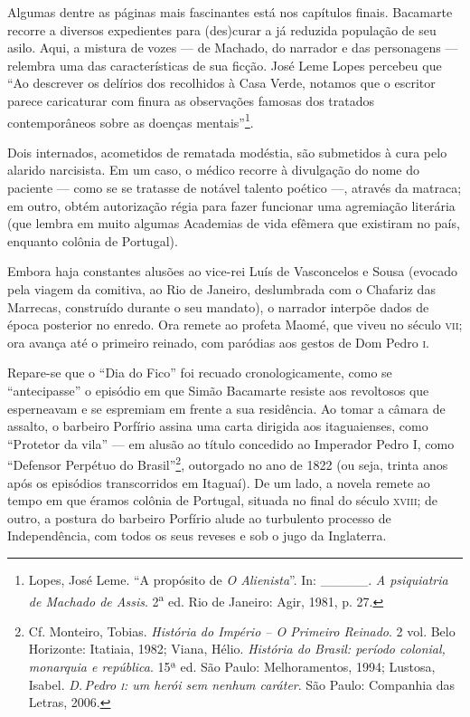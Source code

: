 Algumas dentre as páginas mais fascinantes está nos capítulos finais.
Bacamarte recorre a diversos expedientes para (des)curar a já reduzida
população de seu asilo. Aqui, a mistura de vozes --- de Machado, do
narrador e das personagens --- relembra uma das características de sua
ficção. José Leme Lopes percebeu que ``Ao descrever os delírios dos
recolhidos à Casa Verde, notamos que o escritor parece caricaturar com
finura as observações famosas dos tratados contemporâneos sobre as
doenças mentais''\footnote{Lopes, José Leme. ``A propósito de \emph{O
  Alienista}''. In: \_\_\_\_\_. \emph{A psiquiatria de Machado de
  Assis}. 2\textsuperscript{a} ed. Rio de Janeiro: Agir, 1981, p. 27.}.

Dois internados, acometidos de rematada modéstia, são submetidos à cura
pelo alarido narcisista. Em um caso, o médico recorre à divulgação do
nome do paciente --- como se se tratasse de notável talento poético ---,
através da matraca; em outro, obtém autorização régia para fazer
funcionar uma agremiação literária (que lembra em muito algumas
Academias de vida efêmera que existiram no país, enquanto colônia de
Portugal).

Embora haja constantes alusões ao vice-rei Luís de Vasconcelos e Sousa
(evocado pela viagem da comitiva, ao Rio de Janeiro, deslumbrada com o
Chafariz das Marrecas, construído durante o seu mandato), o narrador
interpõe dados de época posterior no enredo. Ora remete ao profeta
Maomé, que viveu no século \textsc{vii}; ora avança até o primeiro reinado, com
paródias aos gestos de Dom Pedro \textsc{i}.

Repare-se que o ``Dia do Fico'' foi recuado cronologicamente, como se
``antecipasse'' o episódio em que Simão Bacamarte resiste aos revoltosos
que esperneavam e se espremiam em frente a sua residência. Ao tomar a
câmara de assalto, o barbeiro Porfírio assina uma carta dirigida aos
itaguaienses, como ``Protetor da vila'' --- em alusão ao título concedido
ao Imperador Pedro I, como ``Defensor Perpétuo do Brasil''\footnote{Cf.
  Monteiro, Tobias. \emph{História do Império -- O Primeiro Reinado}. 2
  vol. Belo Horizonte: Itatiaia, 1982; Viana, Hélio. \emph{História do
  Brasil: período colonial, monarquia e república}. 15ª ed. São Paulo:
  Melhoramentos, 1994; Lustosa, Isabel. \emph{D.\,Pedro \textsc{i}: um herói sem
  nenhum caráter}. São Paulo: Companhia das Letras, 2006.}, outorgado no
ano de 1822 (ou seja, trinta anos após os episódios transcorridos em
Itaguaí). De um lado, a novela remete ao tempo em que éramos colônia de
Portugal, situada no final do século \textsc{xviii}; de outro, a postura do
barbeiro Porfírio alude ao turbulento processo de Independência, com
todos os seus reveses e sob o jugo da Inglaterra.

